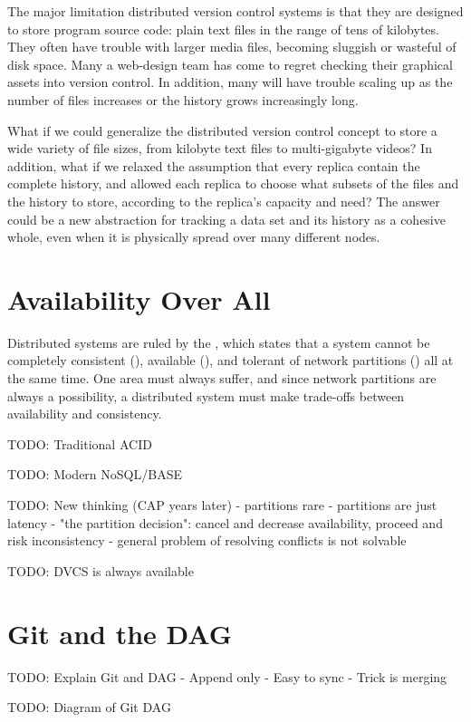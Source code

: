 The major limitation distributed version control systems is that they are
designed to store program source code: plain text files in the range of tens of
kilobytes. They often have trouble with larger media files, becoming sluggish or
wasteful of disk space. Many a web-design team has come to regret checking their
graphical assets into version control. In addition, many will have trouble
scaling up as the number of files increases or the history grows increasingly
long.

What if we could generalize the distributed version control concept to store a
wide variety of file sizes, from kilobyte text files to multi-gigabyte videos?
In addition, what if we relaxed the assumption that every replica contain the
complete history, and allowed each replica to choose what subsets of the files
and the history to store, according to the replica's capacity and need? The
answer could be a new abstraction for tracking a data set and its history as a
cohesive whole, even when it is physically spread over many different nodes.


\section{Availability Over All}

Distributed systems are ruled by the  \cite{cap_origin},
which states that a system cannot be completely consistent (),
available (), and tolerant of network partitions () all at
the same time. One area must always suffer, and since network partitions are
always a possibility, a distributed system must make trade-offs between
availability and consistency.

TODO: Traditional ACID

TODO: Modern NoSQL/BASE

TODO: New thinking (CAP years later)
   - partitions rare
   - partitions are just latency
   - "the partition decision": cancel and decrease availability, proceed and
   risk inconsistency
   - general problem of resolving conflicts is not solvable
   \cite{cap_years_later}

TODO: DVCS is always available


\section{Git and the DAG}

TODO: Explain Git and DAG
    - Append only
    - Easy to sync
    - Trick is merging

TODO: Diagram of Git DAG
